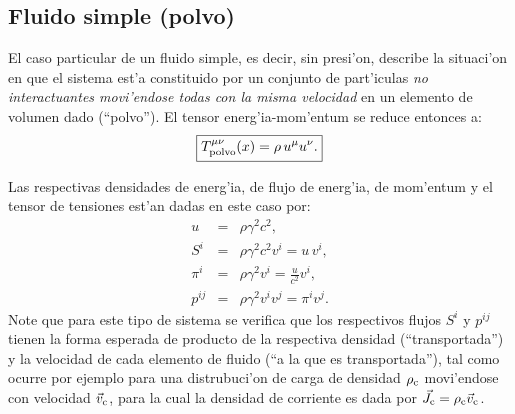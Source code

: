 \subsection{Fluido simple (polvo)}

El caso particular de un fluido simple, es decir, sin presi'on, describe la situaci'on en que el sistema est'a constituido por  un conjunto de part'iculas \textit{no interactuantes movi'endose todas con la misma velocidad} en un elemento de volumen dado (``polvo''). El tensor energ'ia-mom'entum se reduce entonces a:
\begin{equation}
\boxed{T_{\rm polvo}^{\mu\nu}(x)=\rho\, u^\mu u^\nu.}
\end{equation}

Las respectivas densidades de energ'ia, de flujo de energ'ia, de mom'entum y el
tensor de tensiones est'an dadas en este caso por:
\begin{eqnarray}
u&=&\rho \gamma^2 c^2, \\ 
S^i&=&\rho \gamma^2c^2v^i=u\,v^i, \\ 
{\pi}^i&=&\rho \gamma^2v^i =\frac{u}{c^2}v^i, \\ 
p^{ij} &=&\rho \gamma^2 v^i v^j=\pi^iv^j.
\end{eqnarray}
Note que para este tipo de sistema se verifica que los respectivos flujos $S^i$ y $p^{ij}$ tienen la forma esperada de producto de la respectiva densidad (``transportada'') y la velocidad de cada elemento de fluido (``a la que es transportada''), tal como ocurre por ejemplo para una distrubuci'on de carga de densidad $\rho_{\rm c}$ movi'endose con velocidad $\vec{v}_{\rm c}$, para la cual la densidad de corriente es dada por $\vec{J}_{\rm c}=\rho_{\rm c}\vec{v}_{\rm c}$.

